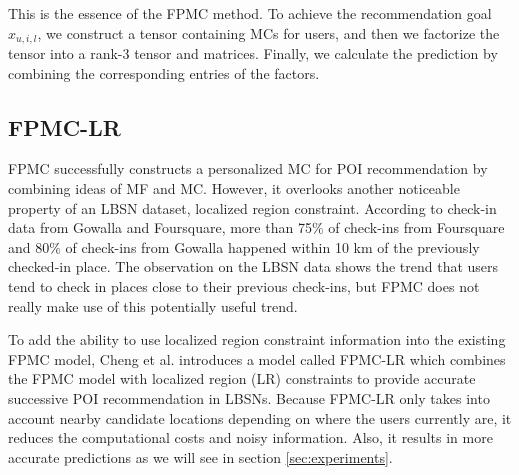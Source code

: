\documentclass{sig-alternate}
\begin{document}
This is the essence of the FPMC method. To achieve the recommendation goal $\hat{x}_{u,i,l}$, we 
construct a tensor containing MCs for users, and then we factorize the tensor into a rank-3 tensor 
and matrices. Finally, we calculate the prediction by combining the corresponding entries of the
factors. 

\subsection{FPMC-LR}
\label{sec:typeChangesSpecialChars}

FPMC successfully constructs a personalized MC for POI recommendation
by combining ideas of MF and MC. However, it overlooks another noticeable property 
of an LBSN dataset, localized region constraint. According to check-in data from 
Gowalla and Foursquare, more than 75\% of check-ins from Foursquare and 80\% of check-ins 
from Gowalla happened within 10 km of the previously checked-in place. The observation on the LBSN data
shows the trend that users tend to check in places close to their previous check-ins, 
but FPMC does not really make use of this potentially useful trend.

To add the ability to use localized region constraint 
information into the existing FPMC model, Cheng et al. \cite{Cheng:2013}
introduces a model called FPMC-LR which combines the FPMC model with localized 
region (LR) constraints to provide accurate successive POI recommendation in LBSNs. 
Because FPMC-LR only takes into account nearby candidate locations depending 
on where the users currently are, it reduces the computational costs and noisy information. 
Also, it results in more accurate predictions as we will see in section \ref{sec:experiments}.
\end{document}
